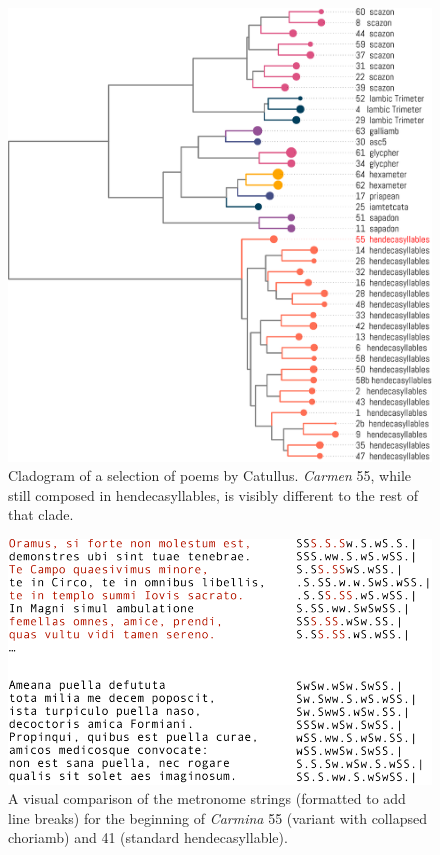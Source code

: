 \documentclass[
    hf
]{ceurart}
\begin{document}
\begin{figure}
    \includegraphics[width=\linewidth]{figures/catullus_dendro-crop.pdf}
    \caption{Cladogram of a selection of poems by Catullus. \emph{Carmen} 55, while still composed in hendecasyllables, is visibly different to the rest of that clade.}
    \label{fig:cat_phylo}
\end{figure}

\begin{figure}
    \centering
    \includegraphics[width=0.8\linewidth]{figures/55v41-crop.pdf}
    \caption{A visual comparison of the metronome strings (formatted to add line breaks) for the beginning of \emph{Carmina} 55 (variant with collapsed choriamb) and 41 (standard hendecasyllable).}
    \label{fig:55_41}
\end{figure}
\end{document}
